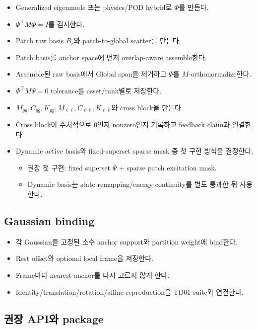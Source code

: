 \documentclass[10pt,a4paper]{article}
\newcommand{\todo}{\textcolor{TodoGray}{\(\square\)}}
\newcommand{\blocked}{\textcolor{BlockRed}{[!]}}
\begin{document}
\begin{itemize}
  \item[\todo] Generalized eigenmode 또는 physics/POD hybrid로 \(\Phi\)를 만든다.
  \item[\todo] \(\Phi^\top M\Phi=I\)를 검사한다.
  \item[\todo] Patch raw basis \(B_r\)와 patch-to-global scatter를 만든다.
  \item[\todo] Patch basis를 anchor space에 먼저 overlap-aware assemble한다.
  \item[\todo] Assemble된 raw basis에서 Global span을 제거하고 \(\Psi\)를 \(M\)-orthonormalize한다.
  \item[\todo] \(\Phi^\top M\Psi=0\) tolerance를 asset/rank별로 저장한다.
  \item[\todo] \(M_{gg},C_{gg},K_{gg},M_{\ell\ell},C_{\ell\ell},K_{\ell\ell}\)와 cross block을 만든다.
  \item[\todo] Cross block이 수치적으로 0인지 nonzero인지 기록하고 feedback claim과 연결한다.
  \item[\blocked] Dynamic active basis와 fixed-superset sparse mask 중 첫 구현 방식을 결정한다.
    \begin{itemize}
      \item 권장 첫 구현: fixed superset \(\Psi\) + sparse patch excitation mask.
      \item Dynamic basis는 state remapping/energy continuity를 별도 통과한 뒤 사용한다.
    \end{itemize}
\end{itemize}

\subsection*{Gaussian binding}

\begin{itemize}
  \item[\todo] 각 Gaussian을 고정된 소수 anchor support와 partition weight에 bind한다.
  \item[\todo] Rest offset와 optional local frame을 저장한다.
  \item[\todo] Frame마다 nearest anchor를 다시 고르지 않게 한다.
  \item[\todo] Identity/translation/rotation/affine reproduction을 TD01 suite와 연결한다.
\end{itemize}

\subsection*{권장 API와 package}
\end{document}
